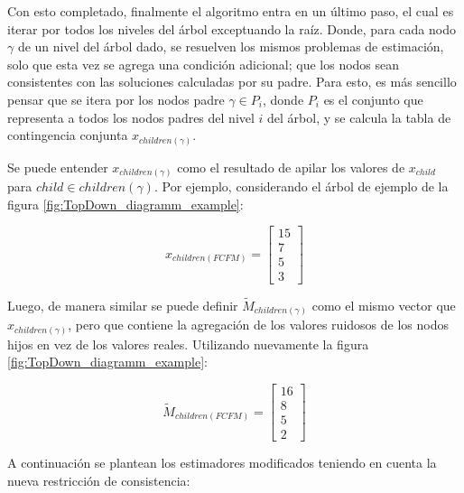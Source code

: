 \documentclass[informe]{upropuesta}
\begin{document}
Con esto completado, finalmente el algoritmo entra en un último paso, el cual es iterar por todos los niveles del árbol exceptuando la raíz. Donde, para cada nodo $\gamma$ de un nivel del árbol dado, se resuelven los mismos problemas de estimación, solo que esta vez se agrega una condición adicional; que los nodos sean consistentes con las soluciones calculadas por su padre. Para esto, es más sencillo pensar que se itera por los nodos padre $\gamma \in P_i$, donde $P_i$ es el conjunto que representa a todos los nodos padres del nivel $i$ del árbol, y se calcula la tabla de contingencia conjunta $x_{\mathit{children}(\gamma)}$. 

Se puede entender $x_{\mathit{children}(\gamma)}$ como el resultado de apilar los valores de $x_{\mathit{child}}$ para $\mathit{child} \in \mathit{children}(\gamma)$. Por ejemplo, considerando el árbol de ejemplo de la figura \ref{fig:TopDown_diagramm_example}:

$$x_{\mathit{children}(FCFM)} = \begin{bmatrix}
    15 \\
    7 \\
    5 \\ 
    3
\end{bmatrix}$$

Luego, de manera similar se puede definir $\widetilde{M}_{\mathit{children}(\gamma)}$ como el mismo vector que $x_{\mathit{children}(\gamma)}$, pero que contiene la agregación de los valores ruidosos de los nodos hijos en vez de los valores reales. Utilizando nuevamente la figura \ref{fig:TopDown_diagramm_example}:

$$\widetilde{M}_{\mathit{children}(FCFM)} = \begin{bmatrix}
    16 \\
    8 \\
    5 \\ 
    2
\end{bmatrix}$$

A continuación se plantean los estimadores modificados teniendo en cuenta la nueva restricción de consistencia:
\end{document}
